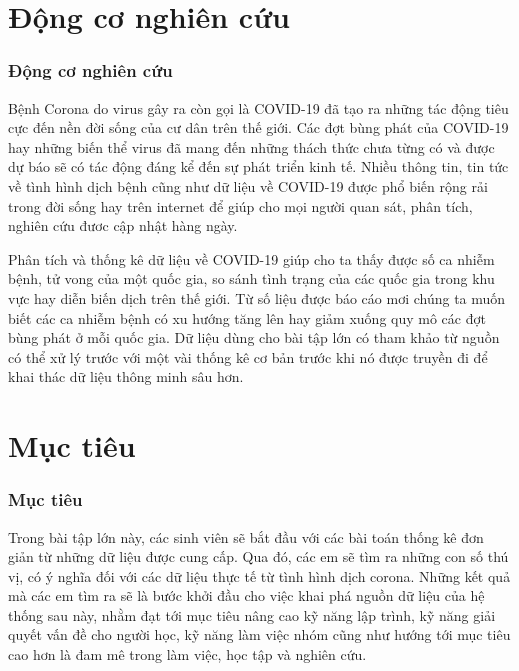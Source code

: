 \documentclass[english,10pt,table]{beamer}
\begin{document}
\section{Động cơ nghiên cứu}
\frame
{
  \frametitle{Động cơ nghiên cứu}	
  \begin{block}{}
Bệnh Corona do virus gây ra còn gọi là COVID-19 đã tạo ra những tác động tiêu cực đến nền đời sống của cư dân trên thế giới. Các đợt bùng phát của COVID-19 hay những biến thể virus đã mang đến những thách thức chưa từng có và được dự báo sẽ có tác động đáng kể đến sự phát triển kinh tế. Nhiều thông tin, tin tức về tình hình dịch bệnh cũng như dữ liệu về COVID-19 được phổ biến rộng rải trong đời sống hay trên internet để giúp cho mọi người quan sát, phân tích, nghiên cứu đươc cập nhật hàng ngày.
\end{block}
\begin{block}{}
Phân tích và thống kê dữ liệu về COVID-19 giúp cho ta thấy được số ca nhiễm bệnh, tử vong của một quốc gia, so sánh tình trạng của các quốc gia trong khu vực hay diễn biến dịch trên thế giới. Từ số liệu được báo cáo mơi chúng ta muốn biết các ca nhiễm bệnh có xu hướng tăng lên hay giảm xuống quy mô các đợt bùng phát ở mỗi quốc gia. Dữ liệu dùng cho bài tập lớn có tham khảo từ nguồn có thể xử lý trước với một vài thống kê cơ bản trước khi nó được truyền đi để khai thác dữ liệu thông minh sâu hơn.
\end{block}
}



\section{Mục tiêu}
\frame
{
	\frametitle{Mục tiêu}
	\begin{block}{}
Trong bài tập lớn này, các sinh viên sẽ bắt đầu với các bài toán thống kê đơn giản từ những dữ liệu được cung cấp. Qua đó, các em sẽ tìm ra những con số thú vị, có ý nghĩa đối với các dữ liệu thực tế từ tình hình dịch corona. Những kết quả mà các em tìm ra sẽ là bước khởi đầu cho việc khai phá nguồn dữ liệu của hệ thống sau này, nhằm đạt tới mục tiêu nâng cao kỹ năng lập trình, kỹ năng giải quyết vấn đề cho người học, kỹ năng làm việc nhóm cũng như hướng tới mục tiêu cao hơn là đam mê trong làm việc, học tập và nghiên cứu.
\end{block}
}
\end{document}
